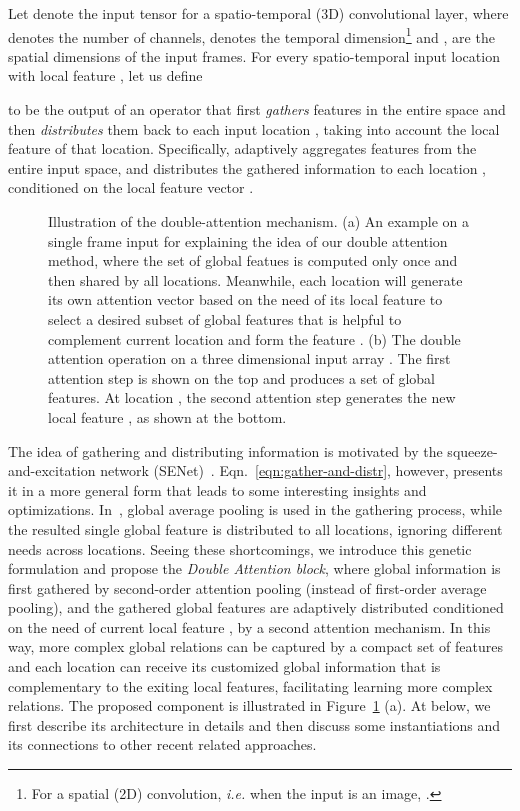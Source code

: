 \documentclass{article}
\begin{document}
Let  denote the input tensor for a spatio-temporal (3D) convolutional layer, where  denotes the number of channels,  denotes the temporal dimension\footnote{For a spatial (2D) convolution, \emph{i.e.} when the input is an image, .} and ,  are the spatial dimensions of the input frames. For every spatio-temporal input location  with local feature , let us define

to be the output of an operator that first \textit{gathers} features in the entire space
and then \textit{distributes} them back to each input location , taking into account the local feature  of that location.
Specifically,  adaptively aggregates features from the entire input space, and  distributes the gathered information to each location , conditioned on the local feature vector . 

 
\begin{figure}[t]
\centering
{}
\caption{Illustration of the double-attention mechanism. (a) An example on a single frame input for explaining the idea of our double attention method, where the set of global featues is computed only once and then shared by all locations.
Meanwhile, each location  will generate its own attention vector based on the need of its local feature  to select a desired subset of global features that is helpful to complement current location and form the feature . (b) The double attention operation on a three dimensional input array . The first attention step is shown on the top and produces a set of global features. At location , the second attention step generates the new local feature , as shown at the bottom.}
\label{fig:AA-operation}
\end{figure}


The idea of gathering and distributing information is motivated by the squeeze-and-excitation network (SENet)~\cite{hu2017}.
Eqn.~\eqref{eqn:gather-and-distr}, however, presents it in a more general form that leads to some interesting insights and optimizations. In~\cite{hu2017}, global average pooling is used in the gathering process, while the resulted single global feature is distributed to all locations, ignoring different needs  across locations. Seeing these shortcomings, we introduce this genetic formulation and propose the \textit{Double Attention block}, where global information is first gathered by second-order  attention pooling (instead of first-order average pooling), and the gathered global features are adaptively distributed conditioned on the need of current local feature , by a second attention mechanism. In this way, more complex global relations can be captured by a compact set of features and each location can receive its customized global information that is complementary to the exiting local features, facilitating learning more complex relations. 
The proposed component  is illustrated in Figure~\ref{fig:AA-operation} (a). At below, we first describe its architecture in details and then discuss some instantiations and its connections to other recent related approaches.
\end{document}
